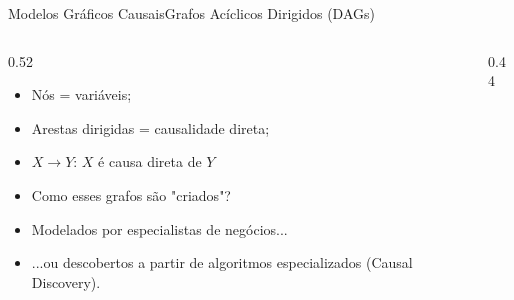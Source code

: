 \begin{frame}{Modelos Gráficos Causais}{Grafos Acíclicos Dirigidos (DAGs)}
    \begin{columns}[T]
        \begin{column}{0.52\textwidth}
            \begin{itemize}
                \item Nós = variáveis; 
                \item Arestas dirigidas = causalidade direta;
                \item $X \rightarrow Y$: $X$ é causa direta de $Y$ %
                \vspace{20pt}
                \item<2-> Como esses grafos são "criados"?
                \item<3-> Modelados por especialistas de negócios...
                \item<4-> ...ou descobertos a partir de algoritmos especializados (Causal Discovery).
            \end{itemize}
        \end{column}
        \begin{column}{0.44\textwidth}
            \centering
            \vspace{6pt}
            \label{fig:dag_example}
        \end{column}
    \end{columns}
\end{frame}

